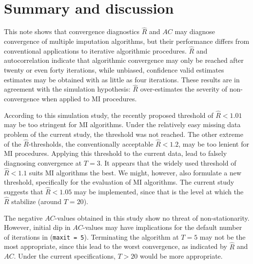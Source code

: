 \documentclass[article]{jss}
\begin{document}

\section{Summary and discussion} \label{sec:summary}

This note shows that convergence diagnostics $\widehat{R}$ and $AC$ may diagnose convergence of multiple imputation algorithms, but their performance differs from conventional applications to iterative algorithmic procedures.   
$\widehat{R}$ and autocorrelation indicate that algorithmic convergence may only be reached after twenty or even forty iterations, while unbiased, confidence valid estimates estimates may be obtained with as little as four iterations. These results are in agreement with the simulation hypothesis: $\widehat{R}$ over-estimates the severity of non-convergence when applied to MI procedures. %

According to this simulation study, the recently proposed threshold of $\widehat{R}<1.01$ may be too stringent for MI algorithms. Under the relatively easy missing data problem of the current study, the threshold was not reached. The other extreme of the $\widehat{R}$-thresholds, the conventionally acceptable $\widehat{R} <1.2$, may be too lenient for MI procedures. Applying this threshold to the current data, lead to falsely diagnosing convergence at $T = 3$. It appears that the widely used threshold of $\widehat{R} < 1.1$ suits MI algorithms the best. We might, however, also formulate a new threshold, specifically for the evaluation of MI algorithms. The current study suggests that $\widehat{R} < 1.05$ may be implemented, since that is the level at which the $\widehat{R}$ stabilize (around $T = 20$). 

The negative $AC$-values obtained in this study show no threat of non-stationarity. However, initial dip in $AC$-values may have implications for the default number of iterations in  (\texttt{maxit = 5}). Terminating the algorithm at $T=5$ may not be the most appropriate, since this lead to the worst convergence, as indicated by $\widehat{R}$ and $AC$. Under the current specifications, $T>20$ would be more appropriate. %
\end{document}

